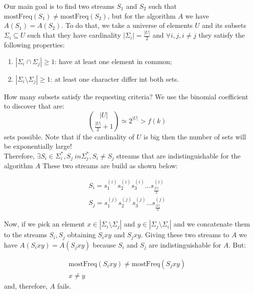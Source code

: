 \documentclass{article}
\begin{document}
Our main goal is to find two streams $S_1$ and $S_2$ such that $\textrm{mostFreq}(S_1) \ne \textrm{mostFreq}(S_2)$, 
but for the algorithm $A$ we have $A(S_1) = A(S_2)$. To do that, we take a universe of elements $U$ and its subsets $\Sigma_i \subseteq U$ such
that they have cardinality $|\Sigma_i| = \frac{|U|}{2}$ and $\forall i, j, i \ne j$ they satisfy the following properties:
\begin{enumerate}
    \item $|\Sigma_i \cap \Sigma_j| \ge 1$: have at least one element in common;
    \item $|\Sigma_i \setminus \Sigma_j| \ge 1$: at least one character differ int both sets.
\end{enumerate}

\noindent How many subsets satisfy the requesting criteria? We use the binomial coefficient to discover that are:
\begin{equation}
    \binom{|U|}{\frac{|U|}{2} + 1} \simeq 2^{|U|} > f(k)
\end{equation}
sets possible. Note that if the cardinality of $U$ is big then the number of sets will be exponentially large!\\

\noindent Therefore, $\exists S_i \in \Sigma_{i}^*, S_j \ in \Sigma_{j}^{*}, S_i \ne S_j$ streams that are indistinguishable for the algorithm $A$
These two streams are build as shown below:

\begin{align}
S_i = s_1^{(i)}s_2^{(i)}s_3^{(i)} \dots s_{\frac{|U|}{2}}^{(i)} \\
S_j = s_1^{(j)}s_2^{(j)}s_3^{(j)} \dots s_{\frac{|U|}{2}}^{(j)}
\end{align}

\noindent Now, if we pick an element $x \in |\Sigma_i \setminus \Sigma_j|$ and $y \in |\Sigma_j \setminus \Sigma_i|$ and we concatenate them to 
the streams $S_i, S_j$ obtaining $S_ixy$ and $S_jxy$. Giving these two streams to $A$ we have $A(S_i xy) = A(S_j xy)$ because $S_i$ and $S_j$ are
indistinguishable for $A$. But:

\begin{align*}
    \textrm{mostFreq}(S_i xy) \ne \textrm{mostFreq}(S_j xy) \\
    x \ne y
\end{align*}
and, therefore, $A$ fails.
\end{document}
